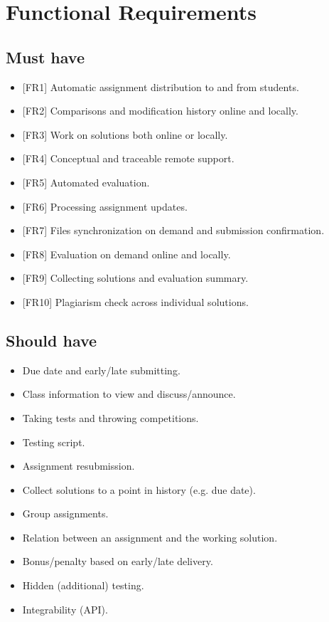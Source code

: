 \section{Functional Requirements} \label{sec:func}

\subsection{Must have} \label{ssec:func-must}

\begin{itemize}
\item
  {{[}FR1{]} Automatic assignment distribution to and from students.}
\item
  {{[}FR2{]} Comparisons and modification history online and locally.}
\item
  {{[}FR3{]} Work on solutions both online or locally.}
\item
  {{[}FR4{]} Conceptual and traceable remote support.}
\item
  {{[}FR5{]} Automated evaluation.}
\item
  {{[}FR6{]} Processing assignment updates.}
\item
  {{[}FR7{]} Files synchronization on demand and submission confirmation.}
\item
  {{[}FR8{]} Evaluation on demand online and locally.}
\item
  {{[}FR9{]} Collecting solutions and evaluation summary.}
\item
  {{[}FR10{]} Plagiarism check across individual solutions.}
\end{itemize}

\subsection{Should have} \label{ssec:func-should}

\begin{itemize}
\item
  {Due date and early/late submitting.}
\item
  {Class information to view and discuss/announce.}
\item
  {Taking tests and throwing competitions.}
\item
  {Testing script.}
\item
  {Assignment resubmission.}
\item
  {Collect solutions to a point in history (e.g. due date).}
\item
  {Group assignments.}
\item
  {Relation between an assignment and the working solution.}
\item
  {Bonus/penalty based on early/late delivery.}
\item
  {Hidden (additional) testing.}
\item
  {Integrability (API).}
\end{itemize}

